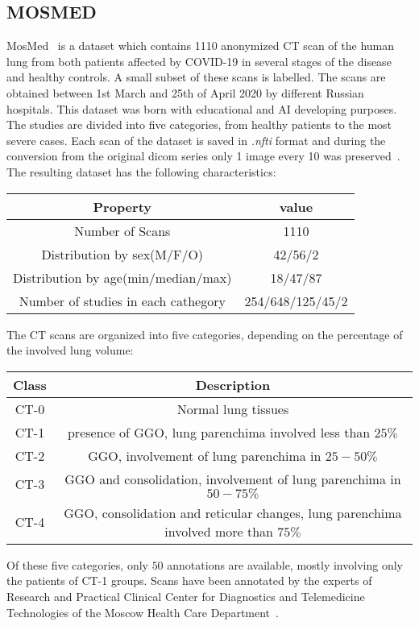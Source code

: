 \documentclass{standalone}
\begin{document}
	\subsection{MOSMED}
	

	MosMed~\cite{DATA:MOSMED} is a dataset which contains 1110 anonymized CT scan of the human lung from both patients affected by COVID-19 in several stages of the disease and healthy controls. A small subset of these scans is labelled. The scans are obtained between 1st March and 25th of April 2020 by different Russian hospitals. This dataset was born with educational and AI developing purposes. The studies are divided into five categories, from healthy patients to the most severe cases. Each scan of the dataset is saved in \emph{.nfti} format and during the conversion from the original dicom series only 1 image every 10 was preserved~\cite{DATA:MOSMED}.
The resulting dataset has the following characteristics: 
	\begin{table}[h!]
		\centering
		\begin{tabular}{|c|c|}
			\hline
			\textbf{Property} 		   				   & \textbf{value}	  \\ \hline
			Number of Scans 		   				   & 1110             \\ 
			Distribution by sex(M/F/O) 				   & 42/56/2          \\
			Distribution by age(min/median/max)		   & 18/47/87         \\
			Number of studies in each cathegory		   & 254/648/125/45/2 \\ \hline
			
		\end{tabular}
	\end{table}

	The CT scans are organized into five categories, depending on the percentage of the involved lung volume: 
	\begin{table}[h!]
		\centering
		\begin{tabular}{|c|c|}
			\hline
			\textbf{Class} & \textbf{Description} \\ \hline
			CT-0		   & Normal  lung tissues \\
			CT-1		   & presence of GGO, lung parenchima involved less than $25\%$ \\
			CT-2		   & GGO, involvement of lung parenchima in $25 - 50\%$ \\
			CT-3		   & GGO and consolidation, involvement of lung parenchima in $50 - 75\%$ \\
			CT-4		   & GGO, consolidation and reticular changes, lung parenchima involved more than $75\%$\\ \hline
		\end{tabular}
	\end{table}

	Of these five categories, only $50$ annotations are available, mostly involving only the patients of CT-1 groups. Scans have been annotated by the experts of Research and Practical Clinical Center for Diagnostics and Telemedicine Technologies of the Moscow Health Care Department~\cite{DATA:MOSMED}.
\end{document}

